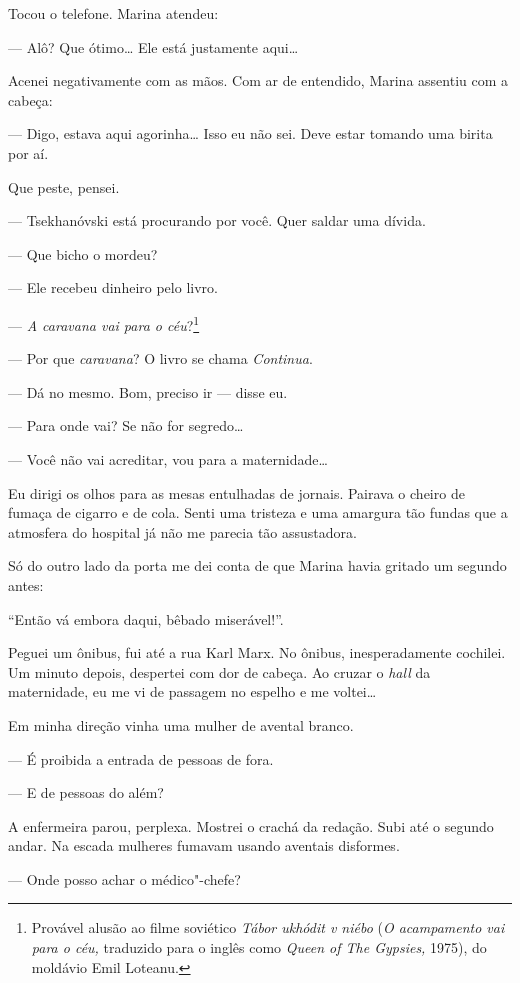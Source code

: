 Tocou o telefone. Marina atendeu:

--- Alô? Que ótimo\ldots{} Ele está justamente aqui\ldots{}

Acenei negativamente com as mãos. Com ar de entendido, Marina assentiu
com a cabeça:

--- Digo, estava aqui agorinha\ldots{} Isso eu não sei. Deve estar tomando
uma birita por aí.

Que peste, pensei.

--- Tsekhanóvski está procurando por você. Quer saldar uma dívida.

--- Que bicho o mordeu?

--- Ele recebeu dinheiro pelo livro.

--- \emph{A caravana vai para o céu}?\footnote{Provável alusão ao filme
  soviético \emph{Tábor ukhódit v niébo} (\emph{O acampamento vai para o
  céu,} traduzido para o inglês como \emph{Queen of The Gypsies,} 1975),
  do moldávio Emil Loteanu.}

--- Por que \emph{caravana}? O livro se chama \emph{Continua}.

--- Dá no mesmo. Bom, preciso ir --- disse eu.

--- Para onde vai? Se não for segredo\ldots{}

--- Você não vai acreditar, vou para a maternidade\ldots{}

Eu dirigi os olhos para as mesas entulhadas de jornais. Pairava o cheiro
de fumaça de cigarro e de cola. Senti uma tristeza e uma amargura tão
fundas que a atmosfera do hospital já não me parecia tão assustadora.

Só do outro lado da porta me dei conta de que Marina havia gritado um
segundo antes:

``Então vá embora daqui, bêbado miserável!''.

Peguei um ônibus, fui até a rua Karl Marx. No ônibus, inesperadamente
cochilei. Um minuto depois, despertei com dor de cabeça. Ao cruzar o
\emph{hall} da maternidade, eu me vi de passagem no espelho e me
voltei\ldots{}

Em minha direção vinha uma mulher de avental branco.

--- É proibida a entrada de pessoas de fora.

--- E de pessoas do além?

A enfermeira parou, perplexa. Mostrei o crachá da redação. Subi até o
segundo andar. Na escada mulheres fumavam usando aventais disformes.

--- Onde posso achar o médico"-chefe?

